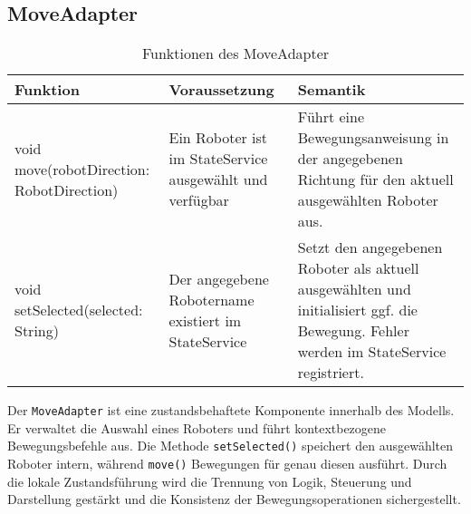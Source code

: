 \subsection{MoveAdapter}
    \begin{table}[h!]
        \centering
        \begin{tabular}{|p{5cm}|p{5cm}|p{5cm}|}
            \hline
            \textbf{Funktion} & \textbf{Voraussetzung} & \textbf{Semantik} \\
            \hline
            void move(robotDirection: RobotDirection) & Ein Roboter ist im StateService ausgewählt und verfügbar & Führt eine Bewegungsanweisung in der angegebenen Richtung für den aktuell ausgewählten Roboter aus. \\
            \hline
            void setSelected(selected: String) & Der angegebene Robotername existiert im StateService & Setzt den angegebenen Roboter als aktuell ausgewählten und initialisiert ggf. die Bewegung. Fehler werden im StateService registriert. \\
            \hline
        \end{tabular}
        \caption{Funktionen des MoveAdapter}
        \label{tab:MoveAdapter}
    \end{table}
    
Der \texttt{MoveAdapter} ist eine zustandsbehaftete Komponente innerhalb des Modells. Er verwaltet die Auswahl eines Roboters und führt kontextbezogene Bewegungsbefehle aus. 
Die Methode \texttt{setSelected()} speichert den ausgewählten Roboter intern, während \texttt{move()} Bewegungen für genau diesen ausführt. 
Durch die lokale Zustandsführung wird die Trennung von Logik, Steuerung und Darstellung gestärkt und die Konsistenz der Bewegungsoperationen sichergestellt.

\clearpage
